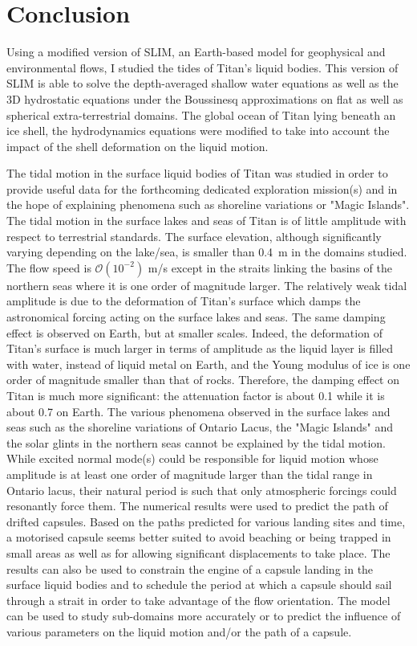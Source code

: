 \section*{Conclusion}

Using a modified version of SLIM, an Earth-based model for geophysical and environmental flows, I studied the tides of Titan's liquid bodies. This version of SLIM is able to solve the depth-averaged shallow water equations as well as the 3D hydrostatic equations under the Boussinesq approximations on flat as well as spherical extra-terrestrial domains. The global ocean of Titan lying beneath an ice shell, the hydrodynamics equations were modified to take into account the impact of the shell deformation on the liquid motion.

The tidal motion in the surface liquid bodies of Titan was studied in order to provide useful data for the forthcoming dedicated exploration mission(s) and in the hope of explaining phenomena such as shoreline variations or "Magic Islands". The tidal motion in the surface lakes and seas of Titan is of little amplitude with respect to terrestrial standards. The surface elevation, although significantly varying depending on the lake/sea, is smaller than 0.4~m in the domains studied. The flow speed is $\mathcal{O}(10^{-2})$ m/s except in the straits linking the basins of the northern seas where it is one order of magnitude larger. The relatively weak tidal amplitude is due to the deformation of Titan's surface which damps the astronomical forcing acting on the surface lakes and seas. The same damping effect is observed on Earth, but at smaller scales. Indeed, the deformation of Titan's surface is much larger in terms of amplitude as the liquid layer is filled with water, instead of liquid metal on Earth, and the Young modulus of ice is one order of magnitude smaller than that of rocks. Therefore, the damping effect on Titan is much more significant: the attenuation factor is about 0.1 while it is about 0.7 on Earth. The various phenomena observed in the surface lakes and seas such as the shoreline variations of Ontario Lacus, the "Magic Islands" and the solar glints in the northern seas cannot be explained by the tidal motion. While excited normal mode(s) could be responsible for liquid motion whose amplitude is at least one order of magnitude larger than the tidal range in Ontario lacus, their natural period is such that only atmospheric forcings could resonantly force them. The numerical results were used to predict the path of drifted capsules. Based on the paths predicted for various landing sites and time, a motorised capsule seems better suited to avoid beaching or being trapped in small areas as well as for allowing significant displacements to take place. The results can also be used to constrain the engine of a capsule landing in the surface liquid bodies and to schedule the period at which a capsule should sail through  a strait in order to take advantage of the flow orientation. The model can be used to study sub-domains more accurately or to predict the influence of various parameters on the liquid motion and/or the path of a capsule.

